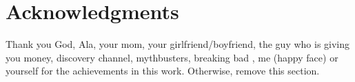 \documentclass[fleqn,12pt]{NTFD} %
\newlength{\tocsep}
\begin{document}
\section*{Acknowledgments} %


Thank you God, Ala, your mom, your girlfriend/boyfriend, the guy who is giving you money, discovery channel, mythbusters, breaking bad , me (happy face) or yourself for the achievements in this work. Otherwise, remove this section.





\end{document}
